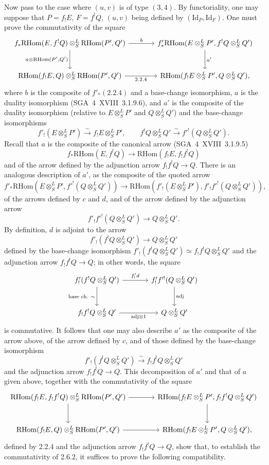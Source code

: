 \documentclass[11pt]{article}
\providecommand{\RHom}{\mathrm{RHom}}
\providecommand{\Id}{\mathrm{Id}}
\begin{document}
Now pass to the case where $(u,v)$ is of type $(3,4)$. By functoriality, one may suppose that $P=f_{!}E$, $F=f^{!}Q$, $(u,v)$ being defined by $(\Id_P,\Id_F)$. One must prove the commutativity of the square
\[
\begin{tikzcd}[column sep=large,row sep=large]
f_*\RHom(E,f^!Q)\otimes^L_S\RHom(P',Q') \arrow[r,"b"] \arrow[d,"{a\otimes\RHom(P',Q')}"'] & f'_*\RHom(E\otimes^L_SP',f^!Q\otimes^L_SQ') \arrow[d,"a'"]\\
\RHom(f_!E,Q)\otimes^L_S\RHom(P',Q') \arrow[r,"2.2.4"'] & \RHom(f_!E\otimes^L_SP',Q\otimes^L_SQ'),
\end{tikzcd}
\]
where $b$ is the composite of $f'_*(2.2.4)$ and a base-change isomorphism, $a$ is the duality isomorphism (SGA~4~XVIII~3.1.9.6), and $a'$ is the composite of the duality isomorphism (relative to $E\otimes^L_SP'$ and $Q\otimes^L_SQ'$) and the base-change isomorphisms
\[
f'_!(E\otimes^L_SP')\xrightarrow{\sim}f_!E\otimes^L_SP',
\qquad
f^!Q\otimes^L_SQ'\xrightarrow{\sim}f'^!(Q\otimes^L_SQ').
\]
Recall that $a$ is the composite of the canonical arrow (SGA~4~XVIII~3.1.9.5)
\[
f_*\RHom(E,f^!Q)\longrightarrow\RHom(f_!E,f_!f^!Q)
\]
and of the arrow defined by the adjunction arrow $f_!f^!Q\to Q$. There is an analogous description of $a'$, as the composite of the quoted arrow
\[
f'_*\RHom(E\otimes^L_SP',f'^!(Q\otimes^L_SQ'))\longrightarrow
\RHom(f'_!(E\otimes^L_SP'),f'_!f'^!(Q\otimes^L_SQ')),
\]
of the arrows defined by $c$ and $d$, and of the arrow defined by the adjunction arrow
\[
f'_!f'^!(Q\otimes^L_SQ')\longrightarrow Q\otimes^L_SQ'.
\]
By definition, $d$ is adjoint to the arrow
\[
f'_!(f^!Q\otimes^L_SQ')\longrightarrow Q\otimes^L_SQ'
\]
defined by the base-change isomorphism $f'_!(f^!Q\otimes^L_SQ')\simeq f_!f^!Q\otimes^L_SQ'$ and the adjunction arrow $f_!f^!Q\to Q$; in other words, the square
\[
\begin{tikzcd}[column sep=large,row sep=large]
f'_!(f^!Q\otimes^L_SQ') \arrow[r,"{f'_!d}"] \arrow[d,"{\text{base ch.}\ \sim}"'] & f'_!f'^!(Q\otimes^L_SQ') \arrow[d,"\mathrm{adj}"]\\
f_!f^!Q\otimes^L_SQ' \arrow[r,"{\mathrm{adj}\otimes 1}"'] & Q\otimes^L_SQ'
\end{tikzcd}
\]
is commutative. It follows that one may also describe $a'$ as the composite of the arrow above, of the arrow defined by $c$, and of those defined by the base-change isomorphism
\[
f'_!(f^!Q\otimes^L_SQ')\xrightarrow{\sim}f_!f^!Q\otimes^L_SQ'
\]
and the adjunction arrow $f_!f^!Q\to Q$. This decomposition of $a'$ and that of $a$ given above, together with the commutativity of the square
\[
\begin{tikzcd}[column sep=large,row sep=large]
\RHom(f_!E,f_!f^!Q)\otimes^L_S\RHom(P',Q') \arrow[r] \arrow[d] & \RHom(f_!E\otimes^L_SP',f_!f^!Q\otimes^L_SQ') \arrow[d]\\
\RHom(f_!E,Q)\otimes^L_S\RHom(P',Q') \arrow[r] & \RHom(f_!E\otimes^L_SP',Q\otimes^L_SQ'),
\end{tikzcd}
\]
defined by 2.2.4 and the adjunction arrow $f_!f^!Q\to Q$, show that, to establish the commutativity of 2.6.2, it suffices to prove the following compatibility.
\end{document}
